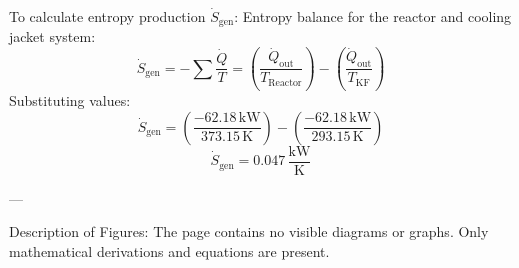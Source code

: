 To calculate entropy production \( \dot{S}_{\text{gen}} \):  
Entropy balance for the reactor and cooling jacket system:  
\[
\dot{S}_{\text{gen}} = -\sum \frac{\dot{Q}}{T} = \left( \frac{\dot{Q}_{\text{out}}}{T_{\text{Reactor}}} \right) - \left( \frac{\dot{Q}_{\text{out}}}{T_{\text{KF}}} \right)
\]  
Substituting values:  
\[
\dot{S}_{\text{gen}} = \left( \frac{-62.18 \, \text{kW}}{373.15 \, \text{K}} \right) - \left( \frac{-62.18 \, \text{kW}}{293.15 \, \text{K}} \right)
\]  
\[
\dot{S}_{\text{gen}} = 0.047 \, \frac{\text{kW}}{\text{K}}
\]  

---

Description of Figures:  
The page contains no visible diagrams or graphs. Only mathematical derivations and equations are present.